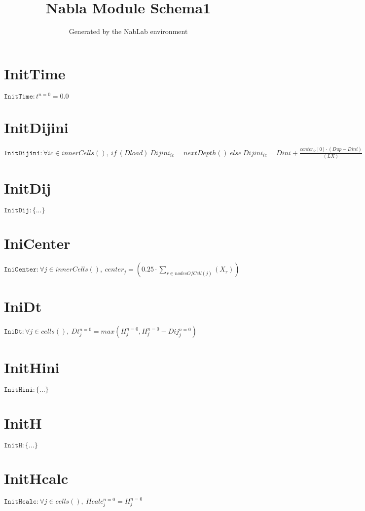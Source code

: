 \documentclass[11pt]{article}
\title{Nabla Module Schema1}
\author{Generated by the NabLab environment}
\begin{document}
\maketitle


\section{InitTime}
$\texttt{InitTime} : t^{n=0} = 0.0$


\section{InitDijini}
$\texttt{InitDijini} : \forall{ic\in innerCells()}, \ if~\left(Dload\right)~Dijini_{ic} = nextDepth\left(\right)~else~Dijini_{ic} = Dini + \frac{center_{ic}\left[0\right] \cdot (Dup - Dini)}{(LX)}$


\section{InitDij}
$\texttt{InitDij} : \{ ... \}$


\section{IniCenter}
$\texttt{IniCenter} : \forall{j\in innerCells()}, \ center_{j} = (0.25 \cdot \sum_{r\in nodesOfCell(j)}\left(X_{r}\right))$


\section{IniDt}
$\texttt{IniDt} : \forall{j\in cells()}, \ Dt^{n=0}_{j} = max\left(H^{n=0}_{j},H^{n=0}_{j} - Dij^{n=0}_{j}\right)$


\section{InitHini}
$\texttt{InitHini} : \{ ... \}$


\section{InitH}
$\texttt{InitH} : \{ ... \}$


\section{InitHcalc}
$\texttt{InitHcalc} : \forall{j\in cells()}, \ Hcalc^{n=0}_{j} = H^{n=0}_{j}$
\end{document}
